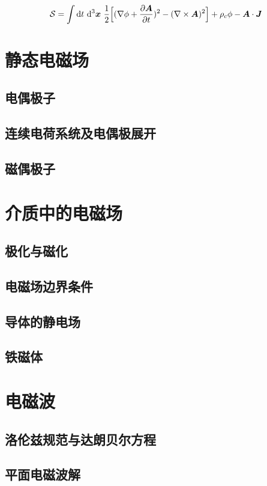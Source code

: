 \documentclass[b5paper]{book}
\begin{document}
\begin{equation}
    \mathcal{S} = \int \mathrm{d} t~\mathrm{d}^3\boldsymbol{x}~\frac{1}{2}\Big[ (\nabla\phi+\frac{\partial\boldsymbol{A}}{\partial t})^2-(\nabla\times\boldsymbol{A})^2  \Big] +\rho_c\phi-\boldsymbol{A}\cdot\boldsymbol{J}
\end{equation}

\chapter{静态电磁场}
\section{电偶极子}
\section{连续电荷系统及电偶极展开}
\section{磁偶极子}

\chapter{介质中的电磁场}
\section{极化与磁化}
\section{电磁场边界条件}
\section{导体的静电场}
\section{铁磁体}




\chapter{电磁波}
\section{洛伦兹规范与达朗贝尔方程}
\section{平面电磁波解}
\end{document}
